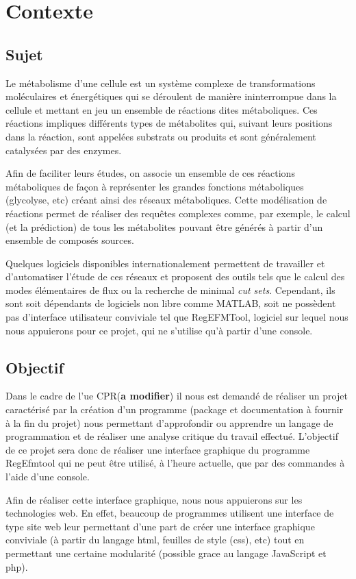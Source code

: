 \chapter{Contexte}
\section{Sujet}
Le métabolisme d'une cellule est un système complexe de transformations moléculaires et énergétiques qui se déroulent 
de manière ininterrompue dans la cellule et mettant en jeu un ensemble de réactions dites métaboliques. 
Ces réactions impliques différents types de métabolites qui, suivant leurs positions dans la réaction, sont appelées 
substrats ou produits et sont généralement catalysées par des enzymes.

Afin de faciliter leurs études, on associe un ensemble de ces réactions métaboliques de façon à représenter les grandes 
fonctions métaboliques (glycolyse, etc) créant ainsi des réseaux métaboliques. Cette modélisation de réactions permet 
de réaliser des requêtes complexes comme, par exemple, le calcul (et la prédiction) de tous les métabolites pouvant 
être générés à partir d’un ensemble de composés sources.

Quelques logiciels disponibles internationalement permettent de travailler et d'automatiser l'étude de ces réseaux 
et proposent des outils tels que le calcul des modes élémentaires de flux ou la recherche de minimal \textit{cut sets}. 
Cependant, ils sont soit dépendants de logiciels non libre comme MATLAB, soit ne possèdent pas d'interface utilisateur 
conviviale tel que RegEFMTool, logiciel sur lequel nous nous appuierons pour ce projet, qui ne s'utilise qu'à partir 
d'une console.\\

\section{Objectif}
Dans le cadre de l'ue CPR(\textbf{a modifier}) il nous est demandé de réaliser un projet caractérisé par la création
d'un programme (package et documentation à fournir à la fin du projet) nous permettant d'approfondir ou apprendre 
un langage de programmation et de réaliser une analyse critique du travail effectué.
L'objectif de ce projet sera donc de réaliser une interface graphique du programme RegEfmtool qui ne peut être utilisé, 
à l'heure actuelle, que par des commandes à l'aide d'une console.

Afin de réaliser cette interface graphique, nous nous appuierons sur les technologies web. En effet, beaucoup de 
programmes utilisent une interface de type site web leur permettant d'une part de créer une interface graphique 
conviviale (à partir du langage html, feuilles de style (css), etc) tout en permettant une certaine modularité 
(possible grace au langage JavaScript et php). 